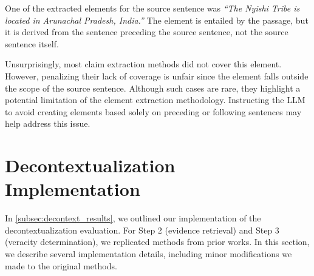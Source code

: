 One of the extracted elements for the source sentence was \textit{``The Nyishi Tribe is located in Arunachal Pradesh, India.''} The element is entailed by the passage, but it is derived from the sentence preceding the source sentence, not the source sentence itself. 

Unsurprisingly, most claim extraction methods did not cover this element. However, penalizing their lack of coverage is unfair since the element falls outside the scope of the source sentence. Although such cases are rare, they highlight a potential limitation of the element extraction methodology. Instructing the LLM to avoid creating elements based solely on preceding or following sentences may help address this issue. 

\section{Decontextualization Implementation}
\label{app:decontext_details}

In \autoref{subsec:decontext_results}, we outlined our implementation of the decontextualization evaluation. For Step 2 (evidence retrieval) and Step 3 (veracity determination), we replicated methods from prior works. In this section, we describe several implementation details, including minor modifications we made to the original methods.

